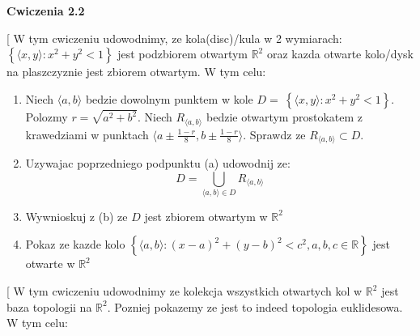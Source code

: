 \documentclass{article}
\makeatletter
\def\myitem{%
   \@ifnextchar[ \@myitem{\@noitemargtrue\@myitem[\@itemlabel]}}
\def\@myitem[#1]{\item[#1]\mbox{}\\}
\makeatother
\begin{document}
\textbf{Cwiczenia 2.2}

\hrulefill

\begin{enumerate}[align=left] %
        \renewcommand{\labelenumi}{\textbf{Cwiczenie 2.2.\arabic{enumi}}}
        
        \myitem W tym cwiczeniu udowodnimy, ze kola(disc)/kula w 2 wymiarach: $\left\{\langle x,y \rangle: x^{2} + y^{2} < 1  \right\}$ jest podzbiorem otwartym ${\mathbb{R}}^2$ oraz kazda otwarte kolo/dysk na plaszczyznie jest zbiorem otwartym.
        \hfill\newline W tym celu:

         \begin{enumerate} 
                \item Niech $\langle a,b \rangle$ bedzie dowolnym punktem w kole $D = \ \left\{\langle x,y \rangle : x^{2} + y^{2} < 1  \right\}$. Polozmy $r = \sqrt{a^{2} + b^{2}}$. Niech $R_{\langle a,b \rangle}$ bedzie otwartym prostokatem z krawedziami w punktach $\langle a \pm \frac{1-r}{8}, b \pm \frac{1-r}{8} \rangle$. Sprawdz ze $R_{\langle a,b \rangle} \subset D$.
                 \item Uzywajac poprzedniego podpunktu (a) udowodnij ze:
                     $$D = \bigcup\limits_{\langle a, b \rangle \in D} R_{\langle a,b \rangle}$$
                 \item Wywnioskuj z (b) ze $D$ jest zbiorem otwartym w ${\mathbb{R}}^{2}$
                 \item Pokaz ze kazde kolo $\left\{ \langle a,b \rangle : (x-a)^{2} + (y-b)^{2}< c^{2}, a,b,c \in \mathbb{R}   \right\}$ jest otwarte w ${\mathbb{R}}^{2}$
        \end{enumerate}

        \myitem W tym cwiczeniu udowodnimy ze kolekcja wszystkich otwartych kol w ${\mathbb{R}}^{2}$ jest baza topologii na $\mathbb{R}^{2}$. Pozniej pokazemy ze jest to indeed topologia euklidesowa. \hfill\newline W tym celu:


\end{enumerate}
\end{document}
